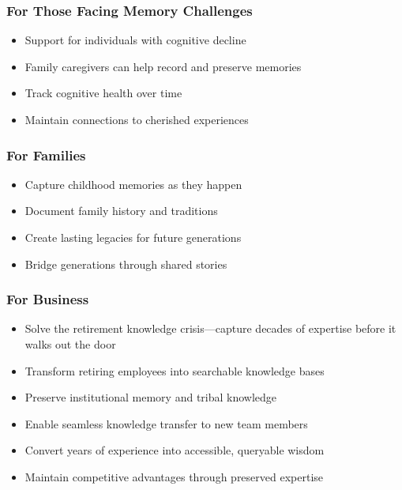 \documentclass[11pt,letterpaper]{article}
\begin{document}
\subsubsection{For Those Facing Memory Challenges}
\begin{itemize}[leftmargin=*]
    \item Support for individuals with cognitive decline
    \item Family caregivers can help record and preserve memories
    \item Track cognitive health over time
    \item Maintain connections to cherished experiences
\end{itemize}

\subsubsection{For Families}
\begin{itemize}[leftmargin=*]
    \item Capture childhood memories as they happen
    \item Document family history and traditions
    \item Create lasting legacies for future generations
    \item Bridge generations through shared stories
\end{itemize}

\subsubsection{For Business}
\begin{itemize}[leftmargin=*]
    \item Solve the retirement knowledge crisis---capture decades of expertise before it walks out the door
    \item Transform retiring employees into searchable knowledge bases
    \item Preserve institutional memory and tribal knowledge
    \item Enable seamless knowledge transfer to new team members
    \item Convert years of experience into accessible, queryable wisdom
    \item Maintain competitive advantages through preserved expertise
\end{itemize}
\end{document}
